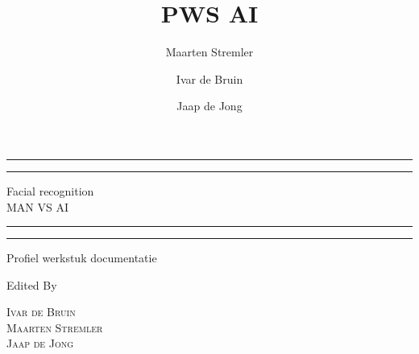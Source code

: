 \documentclass[12pt, titlepage]{article}
\title{PWS AI}
\author{Maarten Stremler \and Ivar de Bruin \and Jaap de Jong}
\begin{document}
	\begin{titlepage} %
		
		\centering %
		
		\scshape %
		
		\vspace*{\baselineskip} %
		
		
		\rule{\textwidth}{1.6pt}\vspace*{-\baselineskip}\vspace*{2pt} %
		\rule{\textwidth}{0.4pt} %
		
		\vspace{0.75\baselineskip} %
		
		{\LARGE Facial recognition\\ MAN VS AI\\} %
		
		\vspace{0.75\baselineskip} %
		
		\rule{\textwidth}{0.4pt}\vspace*{-\baselineskip}\vspace{3.2pt} %
		\rule{\textwidth}{1.6pt} %
		
		\vspace{2\baselineskip} %
		
		
		Profiel werkstuk documentatie %
		
		\vspace*{3\baselineskip} %
		
		
		Edited By
		
		\vspace{0.5\baselineskip} %
		
		{\scshape\Large Ivar de Bruin \\ Maarten Stremler \\ Jaap de Jong \\} %
		

\end{titlepage}
\end{document}
